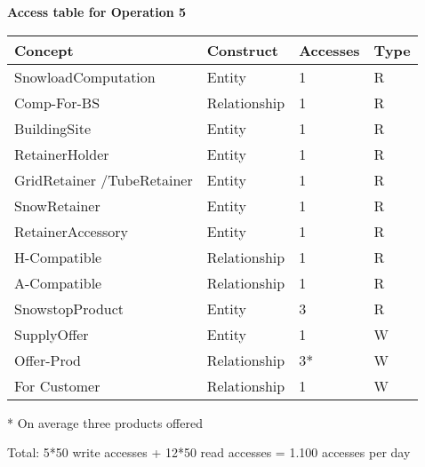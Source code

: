 {{\centering \textbf{Access table for Operation 5}\\}
\begin{table}[H]
  \def\arraystretch{1.10}%
  \centering
  \begin{tabular}{ | m{4cm} | m{4cm}| m{3cm} | m{2cm} |}
    \hline
    {\textbf{\large Concept}} & {\textbf{\large Construct}} & {\textbf{\large Accesses}} & {\textbf{\large Type}} \\
    \hline
    \color[HTML]{3531FF} SnowloadComputation & Entity & 1 & R \\
    \hline
    \color[HTML]{3531FF} Comp-For-BS & Relationship & 1 & R \\
    \hline
    \color[HTML]{3531FF} BuildingSite & Entity & 1 & R \\
    \hline
    \color[HTML]{3531FF} RetainerHolder & Entity & 1 & R \\
    \hline
    \color[HTML]{3531FF} GridRetainer /\newline TubeRetainer & Entity & 1 & R \\
    \hline
    \color[HTML]{3531FF} SnowRetainer & Entity & 1 & R \\
    \hline
    \color[HTML]{3531FF} RetainerAccessory & Entity & 1 & R \\
    \hline
    \color[HTML]{3531FF} H-Compatible & Relationship & 1 & R \\
    \hline
    \color[HTML]{3531FF} A-Compatible & Relationship & 1 & R \\
    \hline
    \color[HTML]{3531FF} SnowstopProduct & Entity & 3 & R \\
    \hline
    \color[HTML]{3531FF} SupplyOffer & Entity & 1 & W \\
    \hline
    \color[HTML]{3531FF} Offer-Prod & Relationship & 3* & W \\
    \hline
    \color[HTML]{3531FF} For Customer & Relationship & 1 & W \\
    \hline
  \end{tabular}
  \small{* On average three products offered}
\end{table}
Total: 5*50 write accesses + 12*50 read accesses = 1.100 accesses per day

\pagebreak

}
